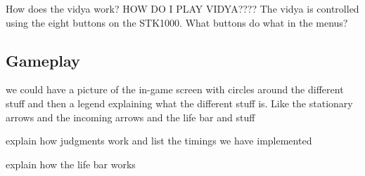 How does the vidya work?
HOW DO I PLAY VIDYA????
The vidya is controlled using the eight buttons on the STK1000.
What buttons do what in the menus?
\subsection{Gameplay}

	we could have a picture of the in-game screen with circles around the different stuff and then a legend explaining what the different stuff is. Like the stationary arrows and the incoming arrows and the life bar and stuff

	explain how judgments work and list the timings we have implemented

	explain how the life bar works